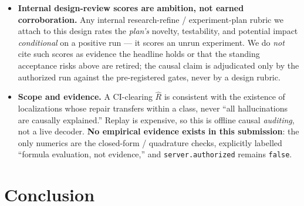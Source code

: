 \documentclass[11pt]{article}
\theoremstyle{plain}
\theoremstyle{definition}
\newcommand{\Rhat}{\widehat{R}}
\begin{document}
\begin{itemize}[leftmargin=1.4em,itemsep=2pt]
  forward surcharge and the v4 decision order; the locked config records it.
  \item \textbf{Internal design-review scores are ambition, not earned corroboration.}
  Any internal research-refine / experiment-plan rubric we attach to this design rates
  the \emph{plan's} novelty, testability, and potential impact \emph{conditional} on a
  positive run --- it scores an unrun experiment. We do \emph{not} cite such scores as
  evidence the headline holds or that the standing acceptance risks above are retired;
  the causal claim is adjudicated only by the authorized run against the pre-registered
  gates, never by a design rubric.
  \item \textbf{Scope and evidence.} A CI-clearing $\Rhat$ is consistent with the
  existence of localizations whose repair transfers within a class, never ``all
  hallucinations are causally explained.'' Replay is expensive, so this is offline
  causal \emph{auditing}, not a live decoder. \textbf{No empirical evidence exists in
  this submission}: the only numerics are the closed-form / quadrature checks,
  explicitly labelled ``formula evaluation, not evidence,'' and
  \texttt{server.authorized} remains \texttt{false}.
\end{itemize}

\section{Conclusion}\label{sec:conclusion}
\end{document}

